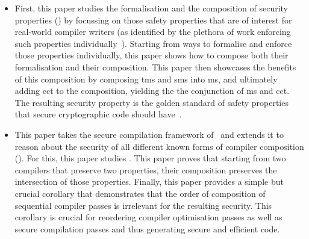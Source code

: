 \documentclass[utf8,acmsmall,review,screen,dvipsnames]{acmart}
\begin{document}
\begin{itemize}
  \item %
        First, this paper studies the formalisation and the composition of security properties () by focussing on those safety properties that are of interest for real-world compiler writers (as identified by the plethora of work enforcing such properties individually~).
        Starting from ways to formalise and enforce those properties individually, this paper shows how to compose both their formalisation and their composition.
        This paper then showcases the benefits of this composition by composing \gls{tms} and \gls{sms} into \gls{ms}, and ultimately adding \gls{cct} to the composition, yielding the the conjunction of \gls{ms} and \gls{cct}.
        The resulting security property is the golden standard of safety properties that secure cryptographic code should have~.

  \item %
        This paper takes the secure compilation framework of~\citep{abate2019jour} and extends it to reason about the security of all different known forms of compiler composition ().
        For this, this paper studies \MP{}.
        This paper proves that starting from two compilers that preserve two properties, their composition preserves the intersection of those properties.
        Finally, this paper provides a simple but crucial corollary that demonstrates that the order of composition of sequential compiler passes is irrelevant for the resulting security.
        This corollary is crucial for reordering compiler optimisation passes as well as secure compilation passes and thus generating secure and efficient code.


\end{itemize}
\end{document}
